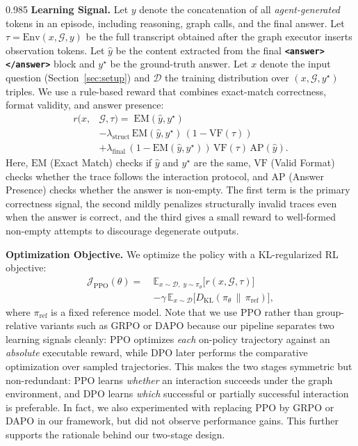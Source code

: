 \documentclass[11pt]{article}
\begin{document}
\begin{spacing}{0.985}
\smallskip
\noindent\textbf{Learning Signal.}
Let $y$ denote the concatenation of all \emph{agent-generated} tokens in an episode, including reasoning, graph calls, and the final answer.
Let $\tau=\mathrm{Env}(x,\mathcal{G},y)$ be the full transcript obtained after the graph executor inserts observation tokens.
Let $\hat{y}$ be the content extracted from the final \textbf{\texttt{<answer>}} \textbf{\texttt{</answer>}} block and $y^\star$ be the ground-truth answer.
Let $x$ denote the input question (Section~\ref{sec:setup}) and $\mathcal{D}$ the training distribution over $(x, \mathcal{G}, y^\star)$ triples.
We use a rule-based reward that combines exact-match correctness, format validity, and answer presence:
\begin{equation}
\begin{split}
\label{eq:reward}
r(x,&\mathcal{G},\tau) =\;\mathrm{EM}(\hat{y},y^\star) \\
&-\lambda_{\text{struct}}\,\mathrm{EM}(\hat{y},y^\star)\,(1-\mathrm{VF}(\tau)) \\
&+\lambda_{\text{final}}\,(1-\mathrm{EM}(\hat{y},y^\star))\,\mathrm{VF}(\tau)\,\mathrm{AP}(\hat{y}).
\end{split}
\end{equation}
Here, $\mathrm{EM}$ (Exact Match) checks if $\hat{y}$ and $y^\star$ are the same, $\mathrm{VF}$ (Valid Format) checks whether the trace follows the interaction protocol, and $\mathrm{AP}$ (Answer Presence) checks whether the answer is non-empty.
The first term is the primary correctness signal, the second mildly penalizes structurally invalid traces even when the answer is correct, and the third gives a small reward to well-formed non-empty attempts to discourage degenerate outputs.

\smallskip
\noindent\textbf{Optimization Objective.}
We optimize the policy with a KL-regularized RL objective:
\begin{equation}
\begin{aligned}
\mathcal{J}_{\mathrm{PPO}}(\theta) = \ & \mathbb{E}_{x \sim \mathcal{D}, \; y \sim \pi_{\theta}} \bigl[ r(x, \mathcal{G}, \tau) \bigr] \\
& - \gamma \, \mathbb{E}_{x \sim \mathcal{D}} \bigl[ D_{\mathrm{KL}}(\pi_{\theta} \,\|\, \pi_{\mathrm{ref}}) \bigr],
\end{aligned}
\label{eq:rl_obj}
\end{equation}
where $\pi_{\mathrm{ref}}$ is a fixed reference model.
Note that we use PPO rather than group-relative variants such as GRPO \cite{shao2024deepseekmath} or DAPO \cite{yu2026dapo} because our pipeline separates two learning signals cleanly: PPO optimizes \textit{each} on-policy trajectory against an \textit{absolute} executable reward, while DPO later performs the comparative optimization over sampled trajectories.
This makes the two stages symmetric but non-redundant: PPO learns \emph{whether} an interaction succeeds under the graph environment, and DPO learns \emph{which} successful or partially successful interaction is preferable.
In fact, we also experimented with replacing PPO by GRPO or DAPO in our framework, but did not observe performance gains. This further supports the rationale behind our two-stage design.


\end{spacing}
\end{document}
